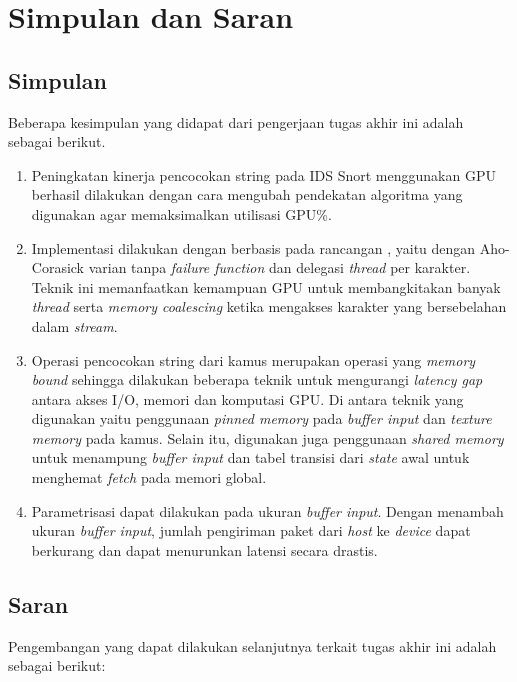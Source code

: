 \chapter{Simpulan dan Saran}

\section{Simpulan}
    Beberapa kesimpulan yang didapat dari pengerjaan tugas akhir ini adalah sebagai berikut.

    \begin{enumerate}

        \item 
        Peningkatan kinerja pencocokan string pada IDS Snort menggunakan GPU berhasil dilakukan dengan cara mengubah pendekatan algoritma yang digunakan agar memaksimalkan utilisasi GPU\%.

        \item
        Implementasi dilakukan dengan berbasis pada rancangan \cite{lin2013}, yaitu dengan Aho-Corasick varian tanpa \emph{failure function} dan delegasi \emph{thread} per karakter. Teknik ini memanfaatkan kemampuan GPU untuk membangkitakan banyak \emph{thread} serta \emph{memory coalescing} ketika mengakses karakter yang bersebelahan dalam \emph{stream}.
        
        \item 
        Operasi pencocokan string dari kamus merupakan operasi yang \emph{memory bound} sehingga dilakukan beberapa teknik untuk mengurangi \emph{latency gap} antara akses I/O, memori dan komputasi GPU. Di antara teknik yang digunakan yaitu penggunaan \emph{pinned memory} pada \emph{buffer input} dan \emph{texture memory} pada kamus. Selain itu, digunakan juga penggunaan \emph{shared memory} untuk menampung \emph{buffer input} dan tabel transisi dari \emph{state} awal untuk menghemat \emph{fetch} pada memori global.

        \item
        Parametrisasi dapat dilakukan pada ukuran \emph{buffer input}. Dengan menambah ukuran \emph{buffer input}, jumlah pengiriman paket dari \emph{host} ke \emph{device} dapat berkurang dan dapat menurunkan latensi secara drastis.
        
    \end{enumerate}\clearpage

\section{Saran}
    Pengembangan yang dapat dilakukan selanjutnya terkait tugas akhir ini adalah sebagai berikut:

